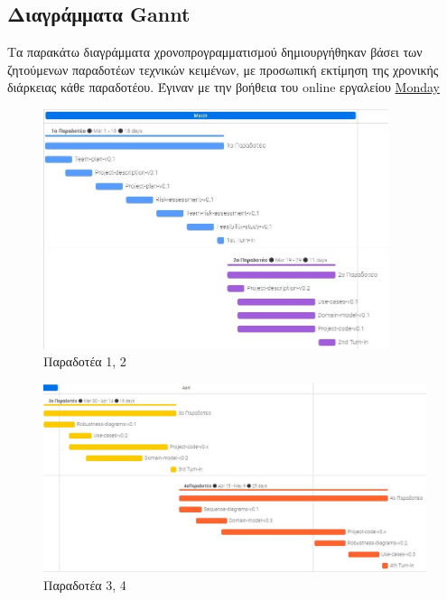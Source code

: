 \documentclass{article}
\begin{document}
\subsection{Διαγράμματα Gannt}

Τα παρακάτω διαγράμματα χρονοπρογραμματισμού δημιουργήθηκαν βάσει των ζητούμενων παραδοτέων τεχνικών κειμένων, με προσωπική εκτίμηση της χρονικής διάρκειας κάθε παραδοτέου. Έγιναν με την βοήθεια του online εργαλείου \href{https://www.monday.com}{Monday}

\vspace{0.3cm}

\begin{figure}[!htb]
\centering
\includegraphics[width=0.9\textwidth]{Team-plan-Gannt-1.jpg}
\caption{\label{fig:log in page} Παραδοτέα 1, 2}
\end{figure}
 
 
\begin{figure}[!htb]
\centering
\includegraphics[width=1.0\textwidth]{Team-plan-Gannt-2.jpg}
\caption{\label{fig:log in page} Παραδοτέα 3, 4}
\end{figure}
\end{document}
